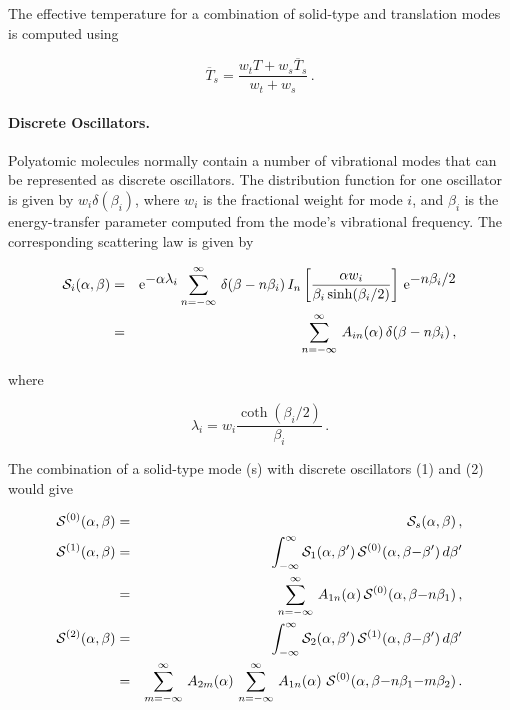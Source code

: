 The effective temperature for a
combination of solid-type and translation modes is computed using

\begin{equation}
   \overline{T}_s = \frac{w_t T + w_s \overline{T}_s}{w_t+w_s}\,.
\end{equation}

\paragraph{Discrete Oscillators.}
Polyatomic molecules normally contain a number of vibrational
modes that can be represented as discrete oscillators.  The distribution
function for one oscillator is given by $w_i\delta(\beta_i)$, where
$w_i$ is the fractional weight for mode $i$, and $\beta_i$ is the
energy-transfer parameter computed from the mode's vibrational
frequency.  The corresponding scattering law is given by

\begin{eqnarray}
   {\cal S}_i(\alpha,\beta) &=& {\rm e}^{\textstyle -\alpha\lambda_i}\sum_{n=-\infty}^\infty\,
     \delta(\beta-n\beta_i) \, I_n \left[
       \frac{\alpha w_i}{\beta_i\sinh(\beta_i/2)} \right]\,
         {\rm e}^{\textstyle -n\beta_i/2}\nonumber\\
      & = & \sum_{n=-\infty}^\infty\,A_{in}(\alpha)\,
             \delta(\beta-n\beta_i)\,,
\end{eqnarray}

\noindent
where

\begin{equation}
   \lambda_i = w_i \frac{\coth(\beta_i/2)}{\beta_i}\,.
\end{equation}

\noindent
The combination of a solid-type mode (s) with discrete
oscillators (1) and (2) would give

\begin{eqnarray}
   {\cal S}^{(0)}(\alpha,\beta)&=&{\cal S}_s(\alpha,\beta)\,,\\
   {\cal S}^{(1)}(\alpha,\beta) &=& \int_{-\infty}^\infty {\cal S}_1(\alpha,\beta')\,
      {\cal S}^{(0)}(\alpha,\beta{-}\beta')\,d\beta' \nonumber\\
       &=& \sum_{n=-\infty}^\infty\,A_{1n}(\alpha)\,
        {\cal S}^{(0)}(\alpha,\beta{-}n\beta_1)\,,\\
    {\cal S}^{(2)}(\alpha,\beta)&=&\int_{-\infty}^\infty {\cal S}_2(\alpha,\beta')\,
       {\cal S}^{(1)}(\alpha,\beta{-}\beta')\,d\beta' \nonumber\\
      &=& \sum_{m=-\infty}^\infty\,A_{2m}(\alpha)\,
           \sum_{n=-\infty}^\infty\,A_{1n}(\alpha)\,\,
        {\cal S}^{(0)}(\alpha,\beta{-}n\beta_1{-}m\beta_2)\,.
\end{eqnarray}

